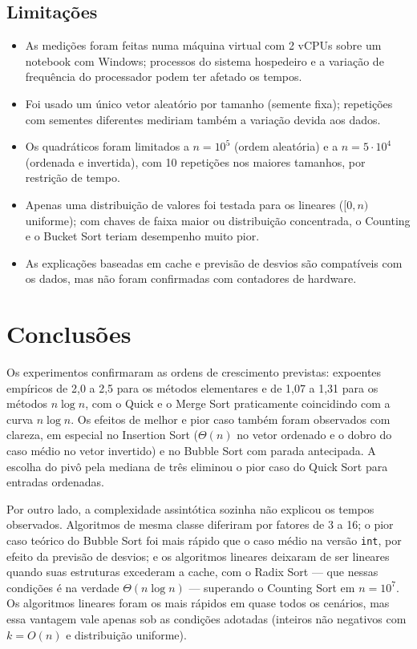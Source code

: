 \documentclass[11pt,a4paper]{article}
\begin{document}
\subsection{Limitações}

\begin{itemize}
  \item As medições foram feitas numa máquina virtual com 2 vCPUs sobre um notebook com Windows;
        processos do sistema hospedeiro e a variação de frequência do processador podem ter afetado
        os tempos.
  \item Foi usado um único vetor aleatório por tamanho (semente fixa); repetições com sementes
        diferentes mediriam também a variação devida aos dados.
  \item Os quadráticos foram limitados a $n=10^5$ (ordem aleatória) e a $n=5\cdot10^4$ (ordenada e
        invertida), com 10 repetições nos maiores tamanhos, por restrição de tempo.
  \item Apenas uma distribuição de valores foi testada para os lineares ($[0,n)$ uniforme); com
        chaves de faixa maior ou distribuição concentrada, o Counting e o Bucket Sort teriam
        desempenho muito pior.
  \item As explicações baseadas em cache e previsão de desvios são compatíveis com os dados, mas
        não foram confirmadas com contadores de hardware.
\end{itemize}

\section{Conclusões}

Os experimentos confirmaram as ordens de crescimento previstas: expoentes empíricos de 2,0 a 2,5
para os métodos elementares e de 1,07 a 1,31 para os métodos $n\log n$, com o Quick e o Merge Sort
praticamente coincidindo com a curva $n\log n$. Os efeitos de melhor e pior caso também foram
observados com clareza, em especial no Insertion Sort ($\Theta(n)$ no vetor ordenado e o dobro do
caso médio no vetor invertido) e no Bubble Sort com parada antecipada. A escolha do pivô pela
mediana de três eliminou o pior caso do Quick Sort para entradas ordenadas.

Por outro lado, a complexidade assintótica sozinha não explicou os tempos observados. Algoritmos de
mesma classe diferiram por fatores de 3 a 16; o pior caso teórico do Bubble Sort foi mais rápido que
o caso médio na versão \texttt{int}, por efeito da previsão de desvios; e os algoritmos lineares
deixaram de ser lineares quando suas estruturas excederam a cache, com o Radix Sort --- que nessas
condições é na verdade $\Theta(n\log n)$ --- superando o Counting Sort em $n=10^7$. Os
algoritmos lineares foram os mais rápidos em quase todos os cenários, mas essa vantagem vale apenas
sob as condições adotadas (inteiros não negativos com $k=O(n)$ e distribuição uniforme).
\end{document}
